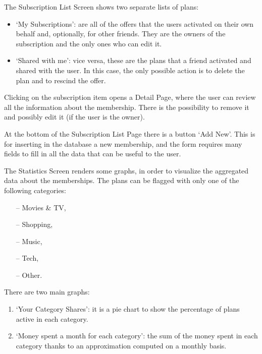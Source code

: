 \documentclass[11pt]{article}
\begin{document}
\vspace{0.5cm}
\vspace{0.2cm}

\noindent The Subscription List Screen shows two separate lists of plans: \begin{itemize}
    \item `My Subscriptions': are all of the offers that the users activated on their own behalf and, optionally, for other friends. They are the owners of the subscription and the only ones who can edit it.
    \item `Shared with me': vice versa, these are the plans that a friend activated and shared with the user. In this case, the only possible action is to delete the plan and to rescind the offer.
\end{itemize}

Clicking on the subscription item opens a Detail Page, where the user can review all the information about the membership. There is the possibility to remove it and possibly edit it (if the user is the owner).

At the bottom of the Subscription List Page there is a button `Add New'. This is for inserting in the database a new membership, and the form requires many fields to fill in all the data that can be useful to the user.

\vspace{0.5cm}
\vspace{0.2cm}

\noindent The Statistics Screen renders some graphs, in order to visualize the aggregated data about the memberships. The plans can be flagged with only one of the following categories:
\begin{itemize}
    \item[--] Movies \& TV,
    \item[--] Shopping,
    \item[--] Music,
    \item[--] Tech,
    \item[--] Other.
\end{itemize}

\noindent There are two main graphs: \begin{enumerate}
    \item `Your Category Shares': it is a pie chart to show the percentage of plans active in each category.
    \item `Money spent a month for each category': the sum of the money spent in each category thanks to an approximation computed on a monthly basis.
\end{enumerate}
\end{document}
